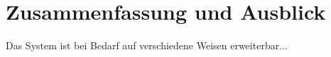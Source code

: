\chapter{\label{chap:fazit}Zusammenfassung und Ausblick}
Das System ist bei Bedarf auf verschiedene Weisen erweiterbar...